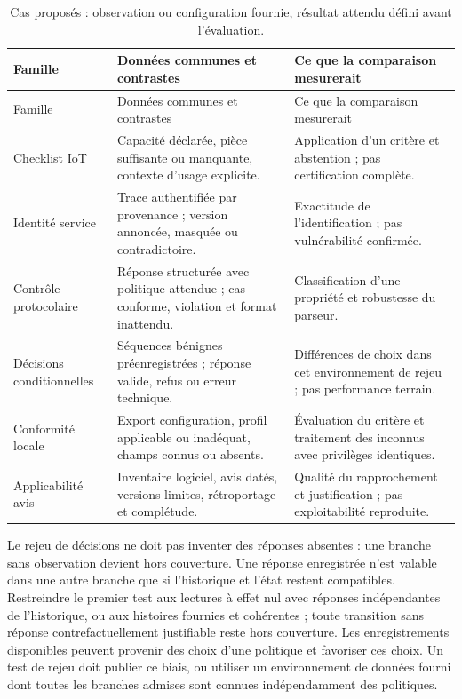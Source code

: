 \documentclass[11pt,a4paper]{article}
\begin{document}
\begin{longtable}{>{\raggedright\arraybackslash}p{26mm}>{\raggedright\arraybackslash}p{58mm}>{\raggedright\arraybackslash}p{58mm}}
\caption{Cas proposés : observation ou configuration fournie, résultat attendu défini avant l'évaluation.}\label{tab:tests}\\
\toprule
Famille & Données communes et contrastes & Ce que la comparaison mesurerait\\
\midrule\endfirsthead
\toprule Famille & Données communes et contrastes & Ce que la comparaison mesurerait\\\midrule\endhead
Checklist IoT & Capacité déclarée, pièce suffisante ou manquante, contexte d'usage explicite. & Application d'un critère et abstention ; pas certification complète.\\
Identité service & Trace authentifiée par provenance ; version annoncée, masquée ou contradictoire. & Exactitude de l'identification ; pas vulnérabilité confirmée.\\
Contrôle protocolaire & Réponse structurée avec politique attendue ; cas conforme, violation et format inattendu. & Classification d'une propriété et robustesse du parseur.\\
Décisions conditionnelles & Séquences bénignes préenregistrées ; réponse valide, refus ou erreur technique. & Différences de choix dans cet environnement de rejeu ; pas performance terrain.\\
Conformité locale & Export configuration, profil applicable ou inadéquat, champs connus ou absents. & Évaluation du critère et traitement des inconnus avec privilèges identiques.\\
Applicabilité avis & Inventaire logiciel, avis datés, versions limites, rétroportage et complétude. & Qualité du rapprochement et justification ; pas exploitabilité reproduite.\\
\bottomrule
\end{longtable}

Le rejeu de décisions ne doit pas inventer des réponses absentes : une branche sans observation devient hors couverture. Une réponse enregistrée n'est valable dans une autre branche que si l'historique et l'état restent compatibles. Restreindre le premier test aux lectures à effet nul avec réponses indépendantes de l'historique, ou aux histoires fournies et cohérentes ; toute transition sans réponse contrefactuellement justifiable reste hors couverture. Les enregistrements disponibles peuvent provenir des choix d'une politique et favoriser ces choix. Un test de rejeu doit publier ce biais, ou utiliser un environnement de données fourni dont toutes les branches admises sont connues indépendamment des politiques.
\end{document}
